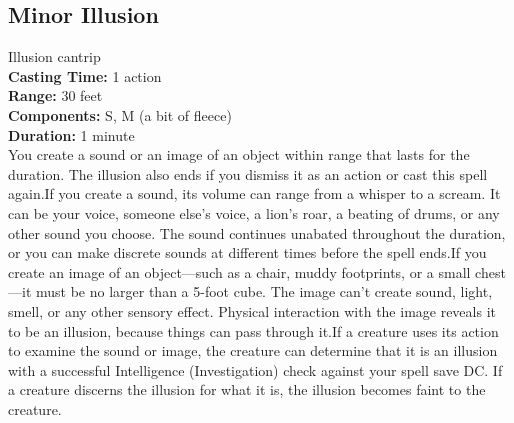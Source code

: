\documentclass[11pt, A4paper, english]{article}
\begin{document}
		\subsection{Minor Illusion}
Illusion cantrip \\
\textbf{Casting Time:} 1 action \\
\textbf{Range:} 30 feet \\
\textbf{Components:} S, M (a bit of fleece) \\
\textbf{Duration:} 1 minute \\
You create a sound or an image of an object within range that lasts for the duration. The illusion also ends if you dismiss it as an action or cast this spell again.If you create a sound, its volume can range from a whisper to a scream. It can be your voice, someone else’s voice, a lion’s roar, a beating of drums, or any other sound you choose. The sound continues unabated throughout the duration, or you can make discrete sounds at different times before the spell ends.If you create an image of an object—such as a chair, muddy footprints, or a small chest—it must be no larger than a 5-foot cube. The image can’t create sound, light, smell, or any other sensory effect. Physical interaction with the image reveals it to be an illusion, because things can pass through it.If a creature uses its action to examine the sound or image, the creature can determine that it is an illusion with a successful Intelligence (Investigation) check against your spell save DC. If a creature discerns the illusion for what it is, the illusion becomes faint to the creature.
\end{document}
